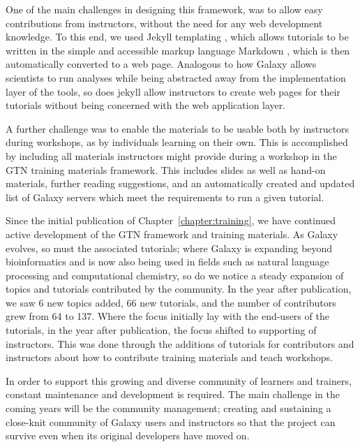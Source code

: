 One of the main challenges in designing this framework, was to allow easy contributions from instructors, without the need for any web development knowledge. To this end, we used Jekyll templating \cite{jekyll}, which allows tutorials to be written in the simple and accessible markup language Markdown \cite{markdown}, which is then automatically converted to a web page. Analogous to how Galaxy allows scientists to run analyses while being abstracted away from the implementation layer of the tools, so does jekyll allow instructors to create web pages for their tutorials without being concerned with the web application layer.

A further challenge was to enable the materials to be usable both by instructors during workshops, as by individuals learning on their own. This is accomplished by including all materials instructors might provide during a workshop in the GTN training materials framework. This includes slides as well as hand-on materials, further reading suggestions, and an automatically created and updated list of Galaxy servers which meet the requirements to run a given tutorial.

\begin{comment}
<closer integration with galaxy servers>

<feedback, planemo, cofests, dashboard, instructor topic, levels, translations, tess search, curricula, toc>

2019: 4 new topics (metabolomics, computational chemistry, data manipulation, ui and features), 66 new tutorials
\end{comment}

Since the initial publication of Chapter~\ref{chapter:training}, we have continued active development of the GTN framework and training materials. As Galaxy evolves, so must the associated tutorials; where Galaxy is expanding beyond bioinformatics and is now also being used in fields such as natural language processing and computational chemistry, so do we notice a steady expansion of topics and tutorials contributed by the community. In the year after publication, we saw 6 new topics added, 66 new tutorials, and the number of contributors grew from 64 to 137. Where the focus initially lay with the end-users of the tutorials, in the year after publication, the focus shifted to supporting of instructors. This was done through the additions of tutorials for contributors and instructors about how to contribute training materials and teach workshops.

In order to support this growing and diverse community of learners and trainers, constant maintenance and development is required. The main challenge in the coming years will be the community management; creating and sustaining a close-knit community of Galaxy users and instructors so that the project can survive even when its original developers have moved on.



